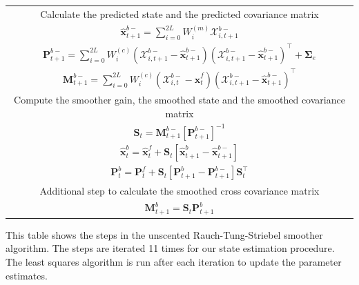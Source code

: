\documentclass[]{article}
\begin{document}
\begin{table}[!ht]
\begin{tabular}{|c|}
\multicolumn{1}{|p{16cm}|}{Calculate the predicted state and the predicted covariance matrix}\\
$\hat{\mathbf x}_{t+1}^{b-}=\sum_{i=0}^{2L} W_i^{(m)}\mathcal X_{i,t+1}^{b-}$\\
$\mathbf P_{t +1}^{b-}=\sum_{i=0}^{2L} W_i^{(c)}(\mathcal X_{i,t+1}^{b-}-\hat{\mathbf x}_{t +1}^{b-})(\mathcal X_{i,t+1}^{b-}-\hat{\mathbf x}_{t +1}^{b-})^\top+\boldsymbol \Sigma_e $\\
$\mathbf M_{t +1}^{b-}=\sum_{i=0}^{2L} W_i^{(c)}(\mathcal X_{i,t}^{b-}-\hat{\mathbf x}_{t}^{f})(\mathcal X_{i,t+1}^{b-}-\hat{\mathbf x}_{t+1}^{b-})^\top$\\
\multicolumn{1}{|p{16cm}|}{Compute the smoother gain, the smoothed state and the smoothed covariance matrix}\\
$\mathbf S_t=\mathbf M_{t +1}^{b-}\left[ \mathbf P_{t +1}^{b-}\right] ^{-1} $\\
$\hat{\mathbf x}_t^b=\hat{\mathbf x}_t^f+\mathbf S_t\left[\hat{\mathbf x}_{t+1}^{b}-\hat{\mathbf x}_{t+1}^{b-}\right]$\\
$\mathbf P_{t}^{b}=\mathbf P_{t}^{f}+\mathbf S_t\left[\mathbf P_{t+1}^{b}-\mathbf P_{t+1}^{b-} \right]\mathbf S_t^\top $\\
\multicolumn{1}{|p{16cm}|}{Additional step to calculate the smoothed cross covariance matrix \cite{Sarkka2008}} \\
$\mathbf M_{t +1}^{b}=\mathbf S_t\mathbf P_{t+1}^{b}$\\
\hline
\end{tabular}
\begin{flushleft}This table shows the steps in the unscented Rauch-Tung-Striebel smoother algorithm. The steps are iterated 11 times for our state estimation procedure. The least squares algorithm is run after each iteration to update the parameter estimates.
\end{flushleft}
\label{tab:UKFAlgorithm}
\end{table}
 \renewcommand{\arraystretch}{1}
\clearpage
\newpage


\end{document}
